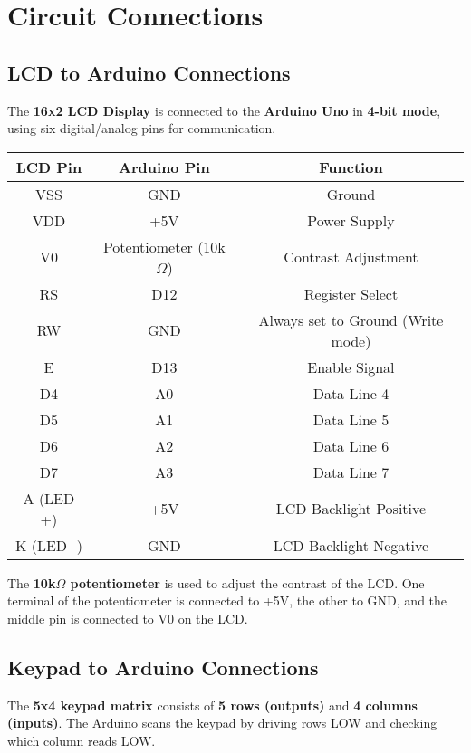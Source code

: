 \documentclass[journal,12pt,onecolumn]{IEEEtran}
\theoremstyle{remark}
\begin{document}
\section{Circuit Connections}

\subsection{LCD to Arduino Connections}
The \textbf{16x2 LCD Display} is connected to the \textbf{Arduino Uno} in \textbf{4-bit mode}, using six digital/analog pins for communication.

\begin{center}
\begin{tabular}{|c|c|c|}
\hline
\textbf{LCD Pin} & \textbf{Arduino Pin} & \textbf{Function} \\
\hline
VSS & GND & Ground \\
VDD & +5V & Power Supply \\
V0 & Potentiometer (10k$\Omega$) & Contrast Adjustment \\
RS & D12 & Register Select \\
RW & GND & Always set to Ground (Write mode) \\
E & D13 & Enable Signal \\
D4 & A0 & Data Line 4 \\
D5 & A1 & Data Line 5 \\
D6 & A2 & Data Line 6 \\
D7 & A3 & Data Line 7 \\
A (LED +) & +5V & LCD Backlight Positive \\
K (LED -) & GND & LCD Backlight Negative \\
\hline
\end{tabular}
\end{center}

The \textbf{10k$\Omega$ potentiometer} is used to adjust the contrast of the LCD. One terminal of the potentiometer is connected to +5V, the other to GND, and the middle pin is connected to V0 on the LCD.

\subsection{Keypad to Arduino Connections}
The \textbf{5x4 keypad matrix} consists of \textbf{5 rows (outputs)} and \textbf{4 columns (inputs)}. The Arduino scans the keypad by driving rows LOW and checking which column reads LOW.
\end{document}
